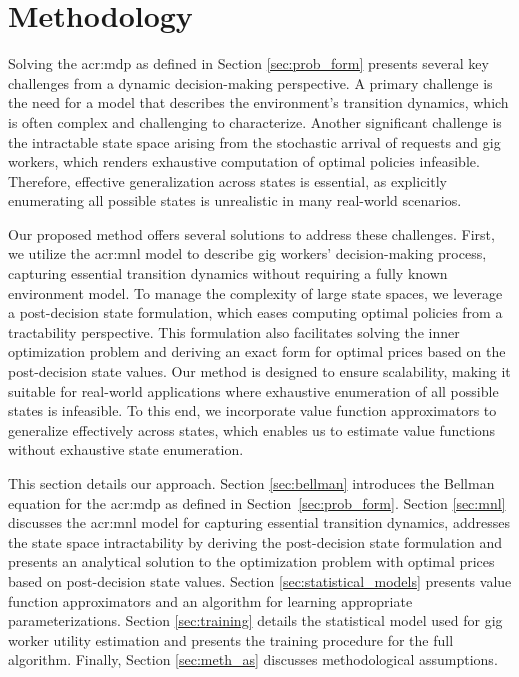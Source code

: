 \section{Methodology}
\label{sec:method}

Solving the \gls{acr:mdp} as defined in Section \ref{sec:prob_form} presents several key challenges from a dynamic decision-making perspective. A primary challenge is the need for a model that describes the environment's transition dynamics, which is often complex and challenging to characterize. Another significant challenge is the intractable state space arising from the stochastic arrival of requests and gig workers, which renders exhaustive computation of optimal policies infeasible. Therefore, effective generalization across states is essential, as explicitly enumerating all possible states is unrealistic in many real-world scenarios.

Our proposed method offers several solutions to address these challenges. First, we utilize the \gls{acr:mnl} model to describe gig workers' decision-making process, capturing essential transition dynamics without requiring a fully known environment model. To manage the complexity of large state spaces, we leverage a post-decision state formulation, which eases computing optimal policies from a tractability perspective. This formulation also facilitates solving the inner optimization problem and deriving an exact form for optimal prices based on the post-decision state values. Our method is designed to ensure scalability, making it suitable for real-world applications where exhaustive enumeration of all possible states is infeasible. To this end, we incorporate value function approximators to generalize effectively across states, which enables us to estimate value functions without exhaustive state enumeration.  

This section details our approach. Section \ref{sec:bellman} introduces the Bellman equation for the \gls{acr:mdp} as defined in Section~\ref{sec:prob_form}. Section \ref{sec:mnl} discusses the \gls{acr:mnl} model for capturing essential transition dynamics, addresses the state space intractability by deriving the post-decision state formulation and presents an analytical solution to the optimization problem with optimal prices based on post-decision state values. Section \ref{sec:statistical_models} presents value function approximators and an algorithm for learning appropriate parameterizations. Section \ref{sec:training} details the statistical model used for gig worker utility estimation and presents the training procedure for the full algorithm. Finally, Section \ref{sec:meth_as} discusses methodological assumptions. 

